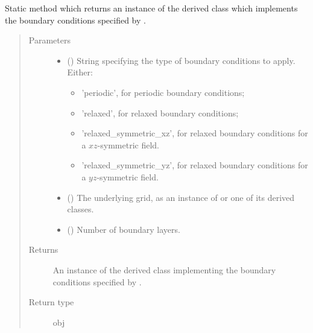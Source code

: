 \documentclass[letterpaper,10pt,english]{sphinxmanual}
\begin{document}
\begin{fulllineitems}
\begin{fulllineitems}
\label{\detokenize{api:dycore.horizontal_boundary.HorizontalBoundary.factory}}
Static method which returns an instance of the derived class which implements the boundary
conditions specified by .
\begin{quote}\begin{description}
\item[{Parameters}] \leavevmode\begin{itemize}
\item {} 
 () \textendash{} 
String specifying the type of boundary conditions to apply. Either:
\begin{itemize}
\item {} 
’periodic’, for periodic boundary conditions;

\item {} 
’relaxed’, for relaxed boundary conditions;

\item {} 
’relaxed\_symmetric\_xz’, for relaxed boundary conditions for a \(xz\)-symmetric field.

\item {} 
’relaxed\_symmetric\_yz’, for relaxed boundary conditions for a \(yz\)-symmetric field.

\end{itemize}


\item {} 
 () \textendash{} The underlying grid, as an instance of {\hyperref[\detokenize{api:grids.grid_xyz.GridXYZ}]{}} or one of its derived classes.

\item {} 
 () \textendash{} Number of boundary layers.

\end{itemize}

\item[{Returns}] \leavevmode
An instance of the derived class implementing the boundary conditions specified by
.

\item[{Return type}] \leavevmode
obj


\end{description}
\end{quote}
\end{fulllineitems}
\end{fulllineitems}
\end{document}
